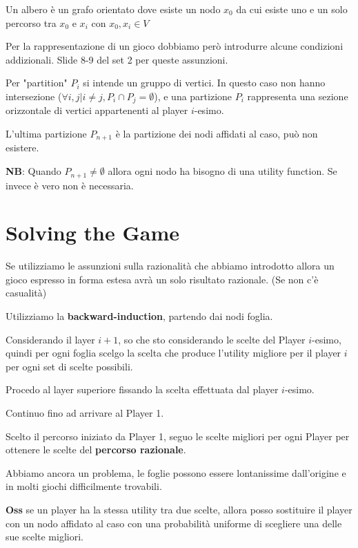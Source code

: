 \documentclass[10pt,a4paper]{report}
\begin{document}
        Un albero è un grafo orientato dove esiste un nodo $x_{0}$ da cui esiste uno e un solo percorso tra $x_{0}$ e $x_{i}$ con $x_{0},x_{i} \in  V$

        Per la rappresentazione di un gioco dobbiamo però introdurre alcune condizioni addizionali.
        Slide 8-9 del set 2 per queste assunzioni. 
        
        Per "partition" $P_{i}$ si intende un gruppo di vertici. In questo caso non hanno intersezione ($\forall i,j | i \neq j, P_{i} \cap P_{j} = \emptyset$), e una partizione $P_{i}$ rappresenta una sezione orizzontale di vertici appartenenti al player $i$-esimo.
        
        L'ultima partizione $P_{n+1}$ è la partizione dei nodi affidati al caso, può non esistere.
        
        \textbf{NB}: Quando $P_{n+1} \neq \emptyset$ allora ogni nodo ha bisogno di una utility function. Se invece è vero non è necessaria.

        \section{Solving the Game}
        Se utilizziamo le assunzioni sulla razionalità che abbiamo introdotto allora un gioco espresso in forma estesa avrà un solo risultato razionale.
        (Se non c'è casualità)

        Utilizziamo la \textbf{backward-induction}, partendo dai nodi foglia.

        Considerando il layer $i+1$, so che sto considerando le scelte del Player $i$-esimo, quindi per ogni foglia scelgo la scelta che produce l'utility migliore per il player $i$ per ogni set di scelte possibili.

        Procedo al layer superiore fissando la scelta effettuata dal player $i$-esimo.

        Continuo fino ad arrivare al Player 1.

        Scelto il percorso iniziato da Player 1, seguo le scelte migliori per ogni Player per ottenere le scelte del \textbf{percorso razionale}.

        Abbiamo ancora un problema, le foglie possono essere lontanissime dall'origine e in molti giochi difficilmente trovabili.

        \textbf{Oss} se un player ha la stessa utility tra due scelte, allora posso sostituire il player con un nodo affidato al caso con una probabilità uniforme di scegliere una delle sue scelte migliori.
\end{document}
